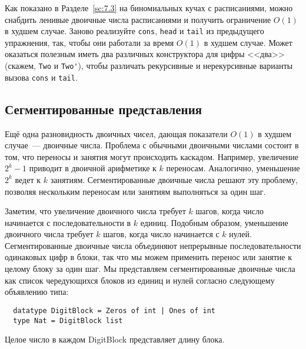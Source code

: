 \begin{exercise}\label{ex:9.10}
  Как показано в Разделе~\ref{sc:7.3} на биномиальных кучах с
  расписаниями, можно снабдить ленивые двоичные числа расписаниями и
  получить ограничение $O(1)$ в худшем случае. Заново реализуйте
  \lstinline!cons!, \lstinline!head! и \lstinline!tail! из предыдущего
  упражнения, так, чтобы они работали за время $O(1)$ в худшем
  случае. Может оказаться полезным иметь два различных конструктора
  для цифры <<два>> (скажем, \lstinline!Two! и \lstinline!Two'!),
  чтобы различать рекурсивные и нерекурсивные варианты вызова \lstinline!cons!
  и \lstinline!tail!.
\end{exercise}

\subsection{Сегментированные представления}
\label{sc:9.2.4}

Ещё одна разновидность двоичных чисел, дающая показатели $O(1)$ в
худшем случае~---  двоичные
числа. Проблема с обычными двоичными числами состоит в том, что
переносы и занятия могут происходить каскадом. Например, увеличение
$2^k - 1$ приводит в двоичной арифметике к $k$ переносам. Аналогично,
уменьшение $2^k$ ведет к $k$ занятиям. Сегментированные двоичные числа
решают эту проблему, позволяя нескольким переносам или занятиям
выполняться за один шаг.

Заметим, что увеличение двоичного числа требует $k$ шагов, когда число
начинается с последовательности в $k$ единиц. Подобным образом,
уменьшение двоичного числа требует $k$ шагов, когда число начинается
с $k$ нулей. Сегментированные двоичные числа объединяют непрерывные
последовательности одинаковых цифр в блоки, так что мы можем применить
перенос или занятие к целому блоку за один шаг. Мы представляем
сегментированные двоичные числа как список чередующихся блоков из
единиц и нулей согласно следующему объявлению типа:
\begin{lstlisting}
  datatype DigitBlock = Zeros of int | Ones of int
  type Nat = DigitBlock list
\end{lstlisting}
Целое число в каждом DigitBlock представляет длину блока.

